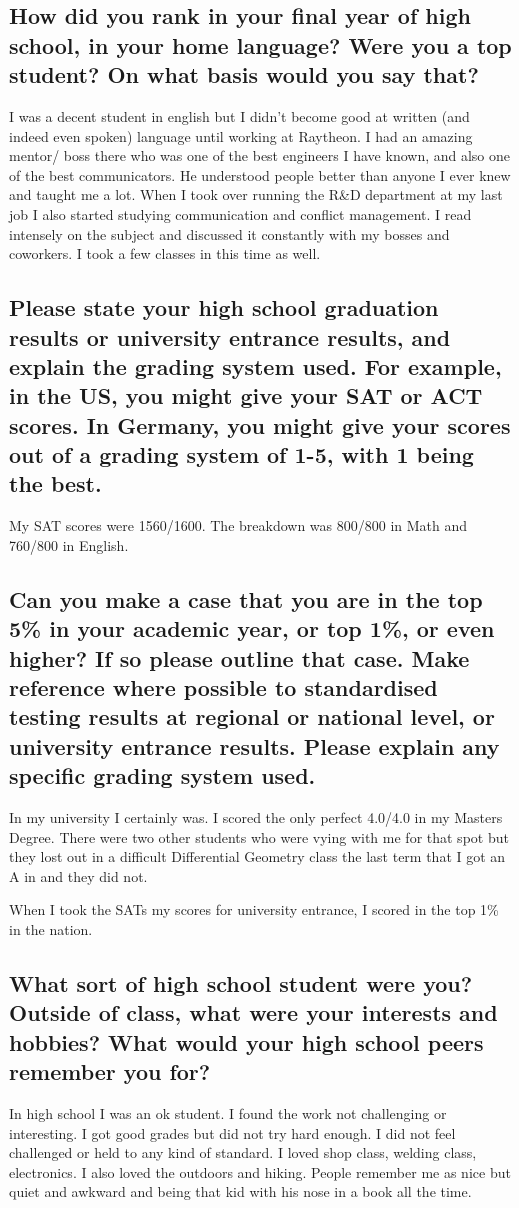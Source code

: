 \documentclass[letter,12pt]{article}
\begin{document}
\subsection{How did you rank in your final year of high school, in your home language? Were you a top student? On what basis would you say that?}
I was a decent student in english but I didn't become good at written (and indeed even spoken) language until working at Raytheon. I had an amazing mentor/ boss there who was one of the best engineers I have known, and also one of the best communicators. He understood people better than anyone I ever knew and taught me a lot. When I took over running the R\&D department at my last job I also started studying communication and conflict management. I read intensely on the subject and discussed it constantly with my bosses and coworkers. I took a few classes in this time as well.

\subsection{Please state your high school graduation results or university entrance results, and explain the grading system used. For example, in the US, you might give your SAT or ACT scores. In Germany, you might give your scores out of a grading system of 1-5, with 1 being the best.}
My SAT scores were 1560/1600. The breakdown was 800/800 in Math and 760/800 in English.

\subsection{Can you make a case that you are in the top 5\% in your academic year, or top 1\%, or even higher? If so please outline that case. Make reference where possible to standardised testing results at regional or national level, or university entrance results. Please explain any specific grading system used.}
In my university I certainly was. I scored the only perfect 4.0/4.0 in my Masters Degree. There were two other students who were vying with me for that spot but they lost out in a difficult Differential Geometry class the last term that I got an A in and they did not.

When I took the SATs my scores for university entrance, I scored in the top 1\% in the nation.

\subsection{What sort of high school student were you? Outside of class, what were your interests and hobbies? What would your high school peers remember you for?}
In high school I was an ok student. I found the work not challenging or interesting. I got good grades but did not try hard enough. I did not feel challenged or held to any kind of standard. I loved shop class, welding class, electronics. I also loved the outdoors and hiking. People remember me as nice but quiet and awkward and being that kid with his nose in a book all the time.
\end{document}
